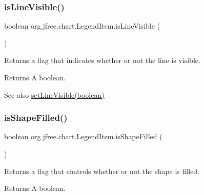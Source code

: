 \subsubsection{\texorpdfstring{is\+Line\+Visible()}{isLineVisible()}}
{\footnotesize\ttfamily boolean org.\+jfree.\+chart.\+Legend\+Item.\+is\+Line\+Visible (\begin{DoxyParamCaption}{ }\end{DoxyParamCaption})}

Returns a flag that indicates whether or not the line is visible.

\begin{DoxyReturn}{Returns}
A boolean.
\end{DoxyReturn}
\begin{DoxySeeAlso}{See also}
\mbox{\hyperlink{classorg_1_1jfree_1_1chart_1_1_legend_item_abcb71ba1ad07cc2d43b0528b50217464}{set\+Line\+Visible(boolean)}} 
\end{DoxySeeAlso}
\mbox{\label{classorg_1_1jfree_1_1chart_1_1_legend_item_a7e46877398956ac078f85d76aed5cb9a}} 
\subsubsection{\texorpdfstring{is\+Shape\+Filled()}{isShapeFilled()}}
{\footnotesize\ttfamily boolean org.\+jfree.\+chart.\+Legend\+Item.\+is\+Shape\+Filled (\begin{DoxyParamCaption}{ }\end{DoxyParamCaption})}

Returns a flag that controls whether or not the shape is filled.

\begin{DoxyReturn}{Returns}
A boolean. 
\end{DoxyReturn}
\mbox{\label{classorg_1_1jfree_1_1chart_1_1_legend_item_a0c35eff4db49fba7e35a4f114dc7afd3}} 
